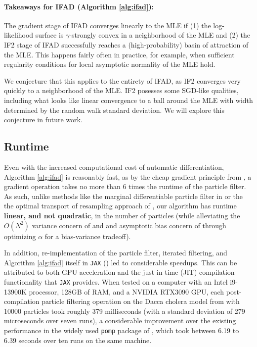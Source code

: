 \documentclass{article}
\begin{document}
\paragraph{Takeaways for IFAD (Algorithm \ref{alg:ifad}):}

The gradient stage of IFAD converges linearly to the MLE if (1) the log-likelihood surface is $\gamma$-strongly convex in a neighborhood of the MLE and (2) the IF2 stage of IFAD successfully reaches a (high-probability) basin of attraction of the MLE. This happens fairly often in practice, for example, when sufficient regularity conditions for local asymptotic normality of the MLE hold.

We conjecture that this applies to the entirety of IFAD, as IF2 converges very quickly to a neighborhood of the MLE. IF2 posesses some SGD-like qualities, including what looks like linear convergence to a ball around the MLE with width determined by the random walk standard deviation. We will explore this conjecture in future work.

\subsection{Runtime}

Even with the increased computational cost of automatic differentiation, Algorithm \ref{alg:ifad} is reasonably fast, as by the cheap gradient principle from \cite{kakade2019provably}, a gradient operation takes no more than 6 times the runtime of the particle filter. As such, unlike methods like the marginal differentiable particle filter in \cite{scibior2021dpf} or the the optimal transport of resampling approach of \cite{corenflos21}, our algorithm has runtime \textbf{linear, and not quadratic}, in the number of particles (while alleviating the $O(N^2)$ variance concern of \cite{poyiadjis11} and \cite{corenflos2021ot} and asymptotic bias concern of \cite{blei2018vsmc} through optimizing $\alpha$ for a bias-variance tradeoff). 

In addition, re-implementation of the particle filter, iterated filtering, and Algorithm \ref{alg:ifad} itself in \texttt{JAX} (\cite{jax2018github}) led to considerable speedups. This can be attributed to both GPU acceleration and the just-in-time (JIT) compilation functionality that \texttt{JAX} provides. When tested on a computer with an Intel i9-13900K processor, 128GB of RAM, and a NVIDIA RTX3090 GPU, each post-compilation particle filtering operation on the Dacca cholera model from \cite{king08} with 10000 particles took roughly 379 milliseconds (with a standard deviation of 279 microseconds over seven runs), a considerable improvement over the existing performance in the widely used \texttt{pomp} package of \cite{king16}, which took between 6.19 to 6.39 seconds over ten runs on the same machine.
\end{document}

